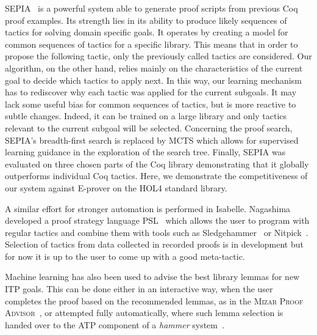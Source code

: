 \documentclass[runningheads,a4paper,draft]{svjour3}
\def\holfour{\textsf{HOL4}\xspace}
\def\isabelle{\textsf{Isabelle}\xspace}
\def\coq{\textsf{Coq}\xspace}
\def\eprover{\textsf{E-prover}\xspace}
\def\sledgehammer{\textsf{Sledgehammer}\xspace}
\begin{document}
\textsf{SEPIA}~\cite{DBLP:conf/cade/GransdenWR15} is a powerful system able to
generate
proof scripts from previous \coq proof examples.
Its strength lies in its ability to produce likely sequences
of tactics for solving domain specific goals. It operates by creating a model
for common sequences of tactics for a specific library.
This means that in order to propose the following tactic, only the previously
called tactics
are considered.
Our algorithm, on the other hand, relies mainly on the characteristics of the
current goal
to decide
which tactics to apply next. In this way, our learning mechanism has to
rediscover why each
tactic was applied for the current subgoals. It may lack some useful bias for
common sequences
of tactics, but is more reactive to subtle changes. Indeed, it can be trained
on a large library and only tactics relevant to the current subgoal will be
selected.
Concerning the proof search, \textsf{SEPIA}'s %
breadth-first search is replaced by MCTS which allows for supervised learning
guidance in the exploration of the search tree.
Finally, \textsf{SEPIA} was evaluated on three chosen parts of the
\coq library demonstrating that it globally outperforms individual \coq
tactics. Here, we demonstrate the competitiveness of our system against
\eprover on the \holfour standard library.

A similar effort for stronger automation is performed in \isabelle. Nagashima
developed a proof strategy language PSL~\cite{NagashimaK17psl} which allows the
user to
program with regular tactics and combine them with tools such as
\sledgehammer~\cite{sledgehammer10} or Nitpick~\cite{Nitpick10}.
Selection of tactics from data collected in recorded proofs is in development
but for now it is up to the user to come up with a good meta-tactic.


Machine learning has also been used to advise the best library lemmas for new
ITP goals.
This can be done either in an interactive way, when the user completes the
proof based on the recommended lemmas, as in the \textsc{Mizar Proof
Advisor}~\cite{Urb04-MPTP0}, or attempted fully automatically, where such lemma
selection is handed over to the ATP component of a \emph{hammer}
system~\cite{hammers4qed,tgck-cpp15,holyhammer,BlanchetteGKKU16,mizAR40}.
\end{document}
